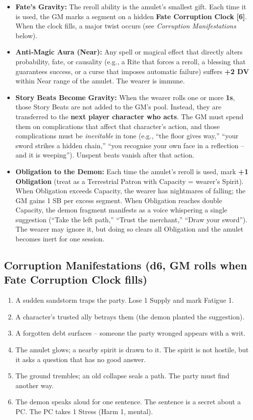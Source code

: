 \documentclass[11pt]{book}
\begin{document}
\begin{itemize}
    \item \textbf{Fate’s Gravity:} The reroll ability is the amulet’s smallest gift. Each time it is used, the GM marks a segment on a hidden \textbf{Fate Corruption Clock [6]}. When the clock fills, a major twist occurs (see \textit{Corruption Manifestations} below).
    \item \textbf{Anti‑Magic Aura (Near):} Any spell or magical effect that directly alters probability, fate, or causality (e.g., a Rite that forces a reroll, a blessing that guarantees success, or a curse that imposes automatic failure) suffers \textbf{+2 DV} within Near range of the amulet. The wearer is immune.
    \item \textbf{Story Beats Become Gravity:} When the wearer rolls one or more \textbf{1s}, those Story Beats are not added to the GM’s pool. Instead, they are transferred to the \textbf{next player character who acts}. The GM must spend them on complications that affect that character’s action, and those complications must be \textit{inevitable} in tone (e.g., “the floor gives way,” “your sword strikes a hidden chain,” “you recognise your own face in a reflection – and it is weeping”). Unspent beats vanish after that action.
    \item \textbf{Obligation to the Demon:} Each time the amulet’s reroll is used, mark \textbf{+1 Obligation} (treat as a Terrestrial Patron with Capacity = wearer’s Spirit). When Obligation exceeds Capacity, the wearer has nightmares of falling; the GM gains 1 SB per excess segment. When Obligation reaches double Capacity, the demon fragment manifests as a voice whispering a single suggestion (“Take the left path,” “Trust the merchant,” “Draw your sword”). The wearer may ignore it, but doing so clears all Obligation and the amulet becomes inert for one session.
\end{itemize}

\subsection*{Corruption Manifestations (d6, GM rolls when Fate Corruption Clock fills)}
\begin{enumerate}
    \item A sudden sandstorm traps the party. Lose 1 Supply and mark Fatigue 1.
    \item A character’s trusted ally betrays them (the demon planted the suggestion).
    \item A forgotten debt surfaces – someone the party wronged appears with a writ.
    \item The amulet glows; a nearby spirit is drawn to it. The spirit is not hostile, but it asks a question that has no good answer.
    \item The ground trembles; an old collapse seals a path. The party must find another way.
    \item The demon speaks aloud for one sentence. The sentence is a secret about a PC. The PC takes 1 Stress (Harm 1, mental).
\end{enumerate}
\end{document}
